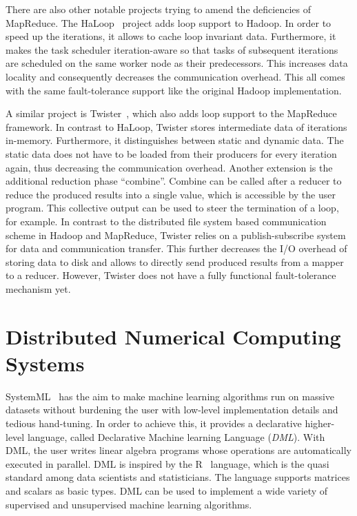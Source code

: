 There are also other notable projects trying to amend the deficiencies of MapReduce.
The HaLoop~\cite{bu:pve2010a} project adds loop support to Hadoop.
In order to speed up the iterations, it allows to cache loop invariant data.
Furthermore, it makes the task scheduler iteration-aware so that tasks of subsequent iterations are scheduled on the same worker node as their predecessors.
This increases data locality and consequently decreases the communication overhead.
This all comes with the same fault-tolerance support like the original Hadoop implementation.

A similar project is Twister~\cite{ekanayake:2010a}, which also adds loop support to the MapReduce framework.
In contrast to HaLoop, Twister stores intermediate data of iterations in-memory.
Furthermore, it distinguishes between static and dynamic data.
The static data does not have to be loaded from their producers for every iteration again, thus decreasing the communication overhead.
Another extension is the additional reduction phase ``combine''.
Combine can be called after a reducer to reduce the produced results into a single value, which is accessible by the user program.
This collective output can be used to steer the termination of a loop, for example.
In contrast to the distributed file system based communication scheme in Hadoop and MapReduce, Twister relies on a publish-subscribe system for data and communication transfer.
This further decreases the I/O overhead of storing data to disk and allows to directly send produced results from a mapper to a reducer.
However, Twister does not have a fully functional fault-tolerance mechanism yet.

\section{Distributed Numerical Computing Systems}

SystemML~\cite{ghoting:2011a} has the aim to make machine learning algorithms run on massive datasets without burdening the user with low-level implementation details and tedious hand-tuning.
In order to achieve this, it provides a declarative higher-level language, called Declarative Machine learning Language (\emph{DML}).
With DML, the user writes linear algebra programs whose operations are automatically executed in parallel.
DML is inspired by the R~\cite{r:1993a} language, which is the quasi standard among data scientists and statisticians.
The language supports matrices and scalars as basic types.
DML can be used to implement a wide variety of supervised and unsupervised machine learning algorithms.

